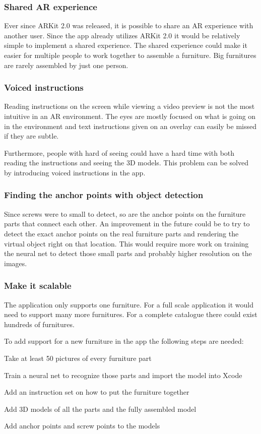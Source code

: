 \subsubsection{Shared AR experience}
Ever since ARKit 2.0 was released, it is possible to share an AR experience with another user.
Since the app already utilizes ARKit 2.0 it would be relatively simple to implement a shared 
experience. The shared experience could make it easier for multiple people to work together to
assemble a furniture. Big furnitures are rarely assembled by just one person.

\subsubsection{Voiced instructions}
Reading instructions on the screen while viewing a video preview is not the most intuitive in an
AR environment. The eyes are mostly focused on what is going on in the environment and text
instructions given on an overlay can easily be missed if they are subtle.

Furthermore, people with hard of seeing could have a hard time with both reading the instructions
and seeing the 3D models. This problem can be solved by introducing voiced instructions in the app.

\subsubsection{Finding the anchor points with object detection}
Since screws were to small to detect, so are the anchor points on the furniture parts that connect
each other.
An improvement in the future could be to try to detect the exact anchor points on the
real furniture parts and rendering the virtual object right on that location. This would
require more work on training the neural net to detect those small parts and probably
higher resolution on the images.

\subsubsection{Make it scalable}
The application only supports one furniture. For a full scale application it would need to support
many more furnitures. For a complete catalogue there could exist hundreds of furnitures.

To add support for a new furniture in the app the following steps are needed:

\begin{list}{•}
\item Take at least 50 pictures of every furniture part
\item Train a neural net to recognize those parts and import the model into Xcode
\item Add an instruction set on how to put the furniture together
\item Add 3D models of all the parts and the fully assembled model
\item Add anchor points and screw points to the models
\end{list}


